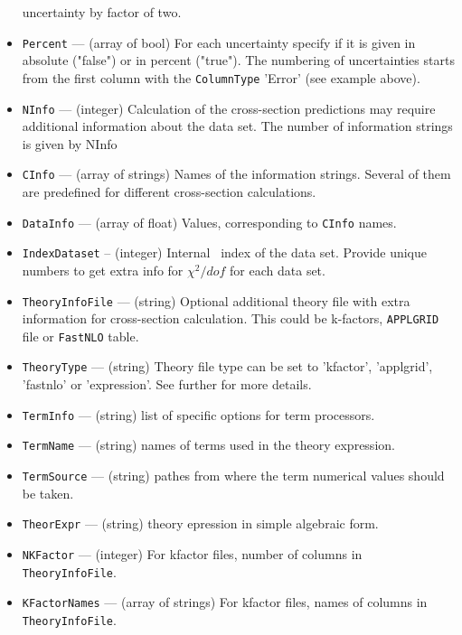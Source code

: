 \begin{itemize}
                      uncertainty by factor of two.                       
      \item {\tt Percent}     --- (array of bool) For each uncertainty specify if it is given in 
                      absolute ("false") or in percent ("true").  The numbering of 
                      uncertainties starts from the first column with the 
                      {\tt ColumnType} 'Error' (see example above).
      \item {\tt NInfo}       --- (integer) Calculation of the cross-section predictions may 
                      require  additional information about the data set. The number of 
                      information strings is given by NInfo
      \item {\tt CInfo}       --- (array of strings) Names of the information strings. 
                      Several of them are predefined for different cross-section 
                      calculations.
      \item {\tt DataInfo}    --- (array of float) Values, corresponding to {\tt CInfo} names.
      \item {\tt IndexDataset} -- (integer) Internal \fitter\ index of the data set. Provide unique
                      numbers to get extra info for $\chi^2/dof$ for each data set.      
      \item {\tt TheoryInfoFile} --- (string) Optional additional theory file with extra 
                     information for cross-section calculation. This could be k-factors,
                     {\tt APPLGRID} file or {\tt FastNLO} table.  
      \item {\tt TheoryType} --- (string) Theory file type can be set to
		     'kfactor', 'applgrid', 'fastnlo' or 'expression'. See further for more
		     details.
      \item {\tt TermInfo} --- (string) list of specific options for term processors.
      \item {\tt TermName} --- (string) names of terms used in the theory expression.
      \item {\tt TermSource} --- (string) pathes from where the term numerical values should be taken.
      \item {\tt TheorExpr} --- (string) theory epression in simple algebraic form.
      \item {\tt NKFactor}   --- (integer) For kfactor files, number of columns in
                     {\tt TheoryInfoFile}.
      \item {\tt KFactorNames} --- (array of strings) For kfactor files, names of columns in 
                     {\tt TheoryInfoFile}.
\end{itemize}

